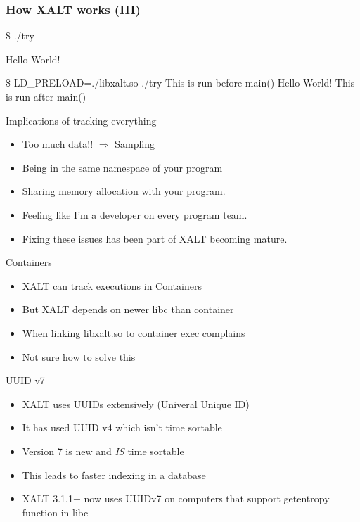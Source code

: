 \documentclass{beamer}
\begin{document}
\begin{frame}[fragile]
    \frametitle{How XALT works (III)}
 {\small
    \begin{semiverbatim}
\$ ./try

Hello World!

\$ LD\_PRELOAD=./libxalt.so  ./try
This is run before main()
Hello World!
This is run after main()
    \end{semiverbatim}
}
\end{frame}

\begin{frame}{Implications of tracking everything}
  \begin{itemize}
    \item Too much data!! $\Rightarrow$ Sampling
    \item Being in the same namespace of your program
    \item Sharing memory allocation with your program.
    \item Feeling like I'm a developer on every program team.
    \item Fixing these issues has been part of XALT becoming mature.
  \end{itemize}
\end{frame}

\begin{frame}{Containers}
  \begin{itemize}
    \item XALT can track executions in Containers
    \item But XALT depends on newer libc than container
    \item When linking libxalt.so to container exec complains
    \item Not sure how to solve this
  \end{itemize}
\end{frame}

\begin{frame}{UUID v7}
  \begin{itemize}
    \item XALT uses UUIDs extensively (Univeral Unique ID)
    \item It has used UUID v4 which isn't time sortable
    \item Version 7 is new and \emph{IS} time sortable
    \item This leads to faster indexing in a database
    \item XALT 3.1.1+ now uses UUIDv7 on computers that support
      getentropy function in libc
  \end{itemize}
\end{frame}
\end{document}
